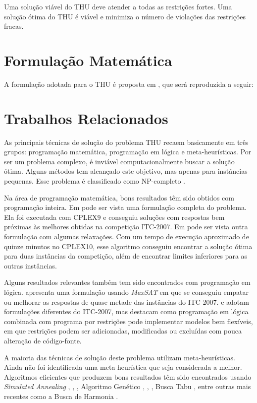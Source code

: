 \documentclass[11pt]{article}
\begin{document}
Uma solução viável do THU deve atender a todas as restrições fortes. Uma solução ótima do THU é viável e minimiza o número de violações das restrições fracas.

\section{Formulação Matemática}
\label{sec:formulacao_matematica}

A formulação adotada para o THU é proposta em \cite{ref}, que será reproduzida a seguir:

\section{Trabalhos Relacionados}
\label{sec:trabalhos_relacionados}

As principais técnicas de solução do problema THU recaem basicamente em três grupos: programação matemática, programação em lógica e meta-heurísticas. Por ser um problema complexo, é inviável computacionalmente buscar a solução ótima. Alguns métodos tem alcançado este objetivo, mas apenas para instâncias pequenas. Esse problema é classificado como NP-completo \cite{Schaerf95asurvey}.

Na área de programação matemática, bons resultados têm sido obtidos com programação inteira. Em \cite{lach_lubbecke} pode ser vista uma formulação completa do problema. Ela foi executada com CPLEX9 e conseguiu soluções com respostas bem próximas às melhores obtidas na competição ITC-2007. Em \cite{Burke_abranch-andcut} pode ser vista outra formulação com algumas relaxações. Com um tempo de execução aproximado de quinze minutos no CPLEX10, esse algoritmo conseguiu encontrar a solução ótima para duas instâncias da competição, além de encontrar limites inferiores para as outras instâncias.

Alguns resultados relevantes também tem sido encontrados com programação em lógica. \cite{springerlink:10.1007/s10479-012-1081-x} apresenta uma formulação usando \textit{MaxSAT} em que se conseguiu empatar ou melhorar as respostas de quase metade das instâncias do ITC-2007. \cite{Gueret95buildinguniversity} e \cite{Goltz99universitytimetabling} adotam formulações diferentes do ITC-2007, mas destacam como programação em lógica combinada com programa por restrições pode implementar modelos bem flexíveis, em que restrições podem ser adicionadas, modificadas ou excluídas com pouca alteração de código-fonte.

A maioria das técnicas de solução deste problema utilizam meta-heurísticas. Ainda não foi identificada uma meta-heurística que seja considerada a melhor.  Algoritmos eficientes que produzem bons resultados têm sido encontrados usando \textit{Simulated Annealing} \cite{3-phaseSA}, \cite{sa_hyper_heuristica}, \cite{Elmohamed98acomparison}, Algoritmo Genético \cite{Erben95agenetic}, \cite{suyanto}, \cite{Kanoh:2008:KGA:1460198.1460201}, Busca Tabu \cite{elloumi2008}, entre outras mais recentes como a Busca de Harmonia \cite{albetar_harmony}.
\end{document}
